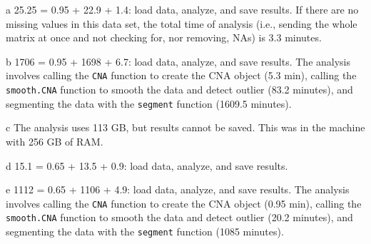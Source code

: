 \documentclass[a4paper,11pt]{article}
\begin{document}
\begin{center}
\begin{threeparttable}
\begin{tablenotes}
{     \item[a] 25.25 = 0.95 + 22.9 + 1.4: load data, analyze, and save
       results. %
      If there are no missing values in this data set, the total time of
      analysis (i.e., sending the whole matrix at once and not checking
      for, nor removing, NAs) is 3.3 minutes.
    \item[b] 1706 =  0.95 + 1698 + 6.7: load data, analyze, and save results. The
      analysis involves calling the \texttt{CNA} function to create the CNA object
      (5.3 min), calling the \texttt{smooth.CNA} function to smooth the data
      and detect outlier (83.2 minutes), and segmenting the data with the
      \texttt{segment} function (1609.5 minutes).
    \item[c] The analysis uses 113 GB, but results cannot be saved. This
      was in the machine with 256 GB of RAM.
     \item[d] 15.1 = 0.65 + 13.5 + 0.9: load data, analyze, and save
       results.
    \item[e] 1112 =  0.65 + 1106 + 4.9: load data, analyze, and save results. The
      analysis involves calling the \texttt{CNA} function to create the CNA object
      (0.95 min), calling the \texttt{smooth.CNA} function to smooth the data
      and detect outlier (20.2 minutes), and segmenting the data with the
      \texttt{segment} function (1085 minutes).

      }
  \end{tablenotes}

\end{threeparttable}
\end{center}



\end{document}

